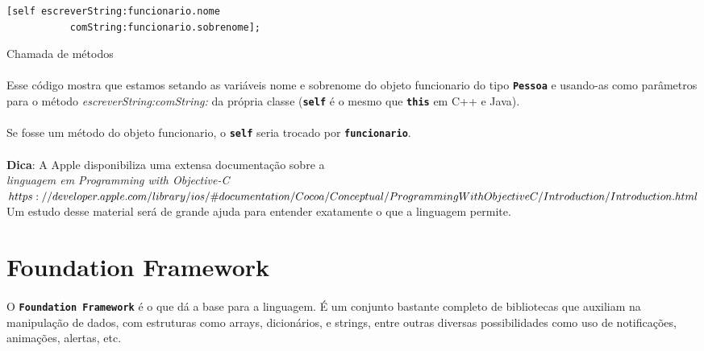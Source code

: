 \documentclass[a4paper,12pt,brazil,doubleside]{book}
\begin{document}
\begin{singlespace}
\begin{listing}
\begin{verbatim}
[self escreverString:funcionario.nome
           comString:funcionario.sobrenome];
\end{verbatim}
\caption{Chamada de métodos}
\end{listing}

\paragraph{}Esse código mostra que estamos setando as variáveis nome e sobrenome do objeto funcionario do tipo \texttt{\textbf{Pessoa}} e usando-as como parâmetros para o método \emph{escreverString:comString:} da própria classe (\texttt{\textbf{self}} é o mesmo que \texttt{\textbf{this}} em C++ e Java).
\paragraph{}Se fosse um método do objeto funcionario, o \texttt{\textbf{self}} seria trocado por \texttt{\textbf{funcionario}}.

\begin{framed}
\paragraph{}\textbf{Dica}: A Apple disponibiliza uma extensa documentação sobre a \textit{\\linguagem em Programming with Objective-C\\ \(https://developer.apple.com/library/ios/\#documentation/Cocoa/Conceptual/\\ProgrammingWithObjectiveC/Introduction/Introduction.html \)\\}
Um estudo desse material será de grande ajuda para entender exatamente o que a linguagem permite.
\end{framed}

\section{Foundation Framework}

\paragraph{}O \texttt{\textbf{Foundation Framework}} é o que dá a base para a linguagem. É um conjunto bastante completo de bibliotecas que auxiliam na manipulação de dados, com estruturas como arrays, dicionários, e strings, entre outras diversas possibilidades como uso de notificações, animações, alertas, etc.

\end{singlespace}
\end{document}
